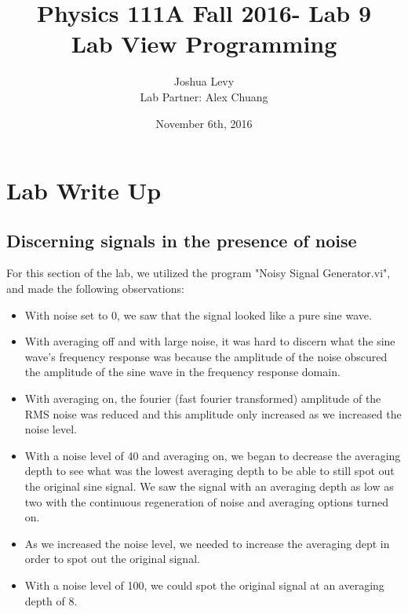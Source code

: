 \documentclass{article}
\title{Physics 111A Fall 2016- Lab 9\\
Lab View Programming}
\author{Joshua Levy\\Lab Partner: Alex Chuang}
\date{November 6th, 2016}
\begin{document}
\maketitle

\section{Lab Write Up}
\subsection{Discerning signals in the presence of noise}
    For this section of the lab, we utilized the program "Noisy Signal Generator.vi", and made the following observations:
    \begin{itemize}
        \item With noise set to 0, we saw that the signal looked like a pure sine wave.
        \item With averaging off and with large noise, it was hard to discern what the sine wave's frequency response was because the amplitude of the noise obscured the amplitude of the sine wave in the frequency response domain.
        \item With averaging on, the fourier (fast fourier transformed) amplitude of the RMS noise was reduced and this amplitude only increased as we increased the noise level.
        \item With a noise level of 40 and averaging on, we began to decrease the averaging depth to see what was the lowest averaging depth to be able to still spot out the original sine signal. We saw the signal with an averaging depth as low as two with the continuous regeneration of noise and averaging options turned on.
        \item As we increased the noise level, we needed to increase the averaging dept in order to spot out the original signal.
        \item With a noise level of 100, we could spot the original signal at an averaging depth of 8.
    \end{itemize}
    
\end{document}
